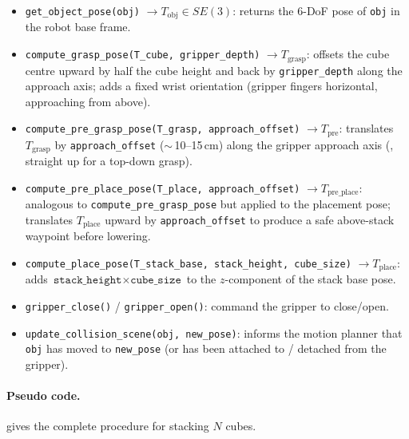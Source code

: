 \documentclass{article}
\begin{document}
\begin{itemize}[leftmargin=*,noitemsep,topsep=0pt]
  \item \texttt{get\_object\_pose(obj)} $\to T_\text{obj} \in SE(3)$: returns the 6-DoF pose of \texttt{obj} in the robot base frame.
  \item \texttt{compute\_grasp\_pose(T\_cube, gripper\_depth)} $\to T_\text{grasp}$: offsets the cube centre upward by half the cube height and back by \texttt{gripper\_depth} along the approach axis; adds a fixed wrist orientation (gripper fingers horizontal, approaching from above).
  \item \texttt{compute\_pre\_grasp\_pose(T\_grasp, approach\_offset)} $\to T_\text{pre}$: translates $T_\text{grasp}$ by \texttt{approach\_offset} ($\sim$\,10--15\,cm) along the gripper approach axis (\ie, straight up for a top-down grasp).
  \item \texttt{compute\_pre\_place\_pose(T\_place, approach\_offset)} $\to T_\text{pre\_place}$: analogous to \texttt{compute\_pre\_grasp\_pose} but applied to the placement pose; translates $T_\text{place}$ upward by \texttt{approach\_offset} to produce a safe above-stack waypoint before lowering.
  \item \texttt{compute\_place\_pose(T\_stack\_base, stack\_height, cube\_size)} $\to T_\text{place}$: adds $\texttt{stack\_height} \times \texttt{cube\_size}$ to the $z$-component of the stack base pose.
  \item \texttt{gripper\_close()} / \texttt{gripper\_open()}: command the gripper to close/open.
  \item \texttt{update\_collision\_scene(obj, new\_pose)}: informs the motion planner that \texttt{obj} has moved to \texttt{new\_pose} (or has been attached to / detached from the gripper).
\end{itemize}

\paragraph{Pseudo code.}

 gives the complete procedure for stacking $N$ cubes.
\end{document}
